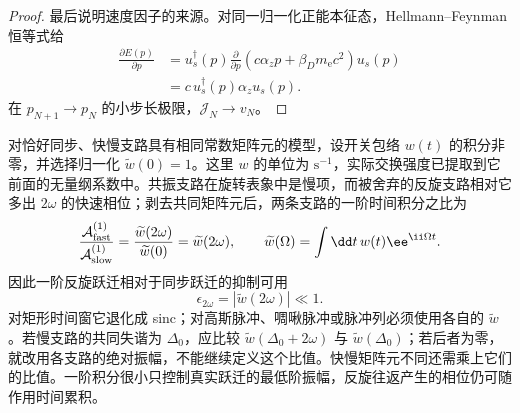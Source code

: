 \begin{proof}
最后说明速度因子的来源。对同一归一化正能本征态，Hellmann--Feynman 恒等式给
\begin{align*}
 \frac{\partial E(p)}{\partial p}
 &=u_s^\dagger(p)
 \frac{\partial}{\partial p}
 \left(c\alpha_z p+\beta_Dm_{\mathrm e} c^2\right)
 u_s(p)\\
 &=c\,u_s^\dagger(p)\alpha_z u_s(p).
\end{align*}
在 $p_{N+1}\to p_N$ 的小步长极限，$\mathcal J_N\to v_N$。
\end{proof}


对恰好同步、快慢支路具有相同常数矩阵元的模型，设开关包络 $w(t)$ 的积分非零，并选择归一化 $\widetilde w(0)=1$。这里 $w$ 的单位为 $\mathrm{s^{-1}}$，实际交换强度已提取到它前面的无量纲系数中。共振支路在旋转表象中是慢项，而被舍弃的反旋支路相对它多出 $2\omega$ 的快速相位；剥去共同矩阵元后，两条支路的一阶时间积分之比为
\begin{equation}
{
\frac{\mathcal A_{\rm fast}^{(1)}}{\mathcal A_{\rm slow}^{(1)}}
=\frac{\widetilde w(2\omega)}{\widetilde w(0)}
=\widetilde w(2\omega),
\qquad
\widetilde w(\Omega)=\int\dd t\,w(t)\ee^{\ii\Omega t}.}
\label{eq:pinem_fast_branch_envelope_ratio}
\end{equation}
因此一阶反旋跃迁相对于同步跃迁的抑制可用
\begin{equation}
{
\epsilon_{2\omega}=|\widetilde w(2\omega)|\ll1.}
\label{eq:feist2015_long_interaction_condition}
\end{equation}
对矩形时间窗它退化成 sinc；对高斯脉冲、啁啾脉冲或脉冲列必须使用各自的 $\widetilde w$。若慢支路的共同失谐为 $\Delta_0$，应比较 $\widetilde w(\Delta_0+2\omega)$ 与 $\widetilde w(\Delta_0)$；若后者为零，就改用各支路的绝对振幅，不能继续定义这个比值。快慢矩阵元不同还需乘上它们的比值。一阶积分很小只控制真实跃迁的最低阶振幅，反旋往返产生的相位仍可随作用时间累积。



